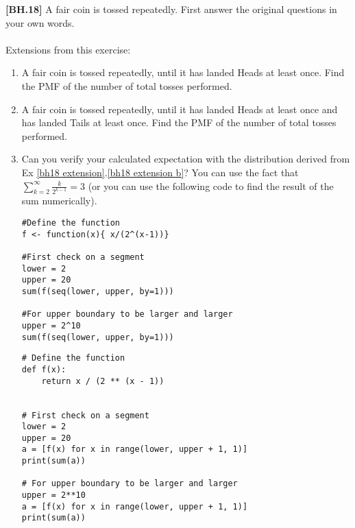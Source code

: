 \begin{exercise}\label{bh18 extension}
    \textbf{[BH.18]} A fair coin is tossed repeatedly. First answer the original questions in your own words.\\~\\
    Extensions from this exercise:
    \begin{enumerate}
        \item\label{bh18 extension a}  A fair coin is tossed repeatedly, until it has landed Heads at least once. Find the PMF of the number of total tosses performed.
        \item\label{bh18 extension b}  A fair coin is tossed repeatedly, until it has landed Heads at least once and has landed Tails at least once. Find the PMF of the number of total tosses performed.
        \item Can you verify your calculated expectation with the distribution derived from Ex \ref{bh18 extension}.\ref{bh18 extension b}? You can use the fact that $\sum_{k = 2}^\infty \frac{k}{2^{k-1}} =3$ (or you can use the following code to find the result of the sum numerically).
        \begin{verbatim}
#Define the function
f <- function(x){ x/(2^(x-1))}

#First check on a segment
lower = 2
upper = 20
sum(f(seq(lower, upper, by=1)))

#For upper boundary to be larger and larger
upper = 2^10
sum(f(seq(lower, upper, by=1)))
        \end{verbatim}
\begin{verbatim}
# Define the function
def f(x):
    return x / (2 ** (x - 1))


# First check on a segment
lower = 2
upper = 20
a = [f(x) for x in range(lower, upper + 1, 1)]
print(sum(a))

# For upper boundary to be larger and larger
upper = 2**10
a = [f(x) for x in range(lower, upper + 1, 1)]
print(sum(a))
\end{verbatim}
    \end{enumerate}
\end{exercise}